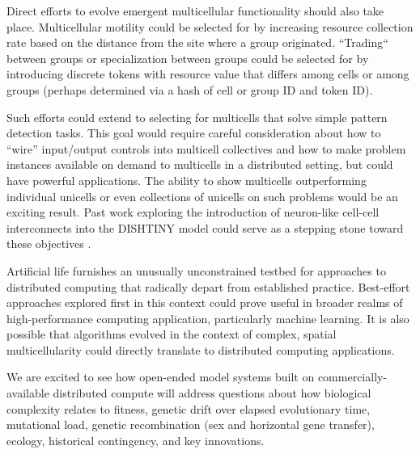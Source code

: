 Direct efforts to evolve emergent multicellular functionality should also take place.
Multicellular motility could be selected for by increasing resource collection rate based on the distance from the site where a group originated.
``Trading`` between groups or specialization between groups could be selected for by introducing discrete tokens with resource value that differs among cells or among groups (perhaps determined via a hash of cell or group ID and token ID).

Such efforts could extend to selecting for multicells that solve simple pattern detection tasks.
This goal would require careful consideration about how to ``wire'' input/output controls into multicell collectives and how to make problem instances available on demand to multicells in a distributed setting, but could have powerful applications.
The ability to show multicells outperforming individual unicells or even collections of unicells on such problems would be an exciting result.
Past work exploring the introduction of neuron-like cell-cell interconnects into the DISHTINY model could serve as a stepping stone toward these objectives \citep{moreno2020practical}.

Artificial life furnishes an unusually unconstrained testbed for approaches to distributed computing that radically depart from established practice.
Best-effort approaches explored first in this context could prove useful in broader realms of high-performance computing application, particularly machine learning.
It is also possible that algorithms evolved in the context of complex, spatial multicellularity could directly translate to distributed computing applications.


We are excited to see how open-ended model systems built on commercially-available distributed compute will address questions about how biological complexity relates to fitness, genetic drift over elapsed evolutionary time, mutational load, genetic recombination (sex and horizontal gene transfer), ecology, historical contingency, and key innovations.
